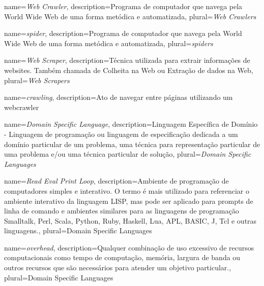 

				{name={\emph{Web Crawler}},
				 description={Programa de computador que navega pela World Wide Web de uma forma metódica e automatizada},
				 plural={\emph{Web Crawlers}}
				}

				{name={\emph{spider}},
				 description={Programa de computador que navega pela World Wide Web de uma forma metódica e automatizada},
				 plural={\emph{spiders}}
				}
				 
				{name={\emph{Web Scraper}},
				 description={Técnica utilizada para extrair informações de websites. Também chamada de Colheita na Web ou Extração de dados na Web},
				 plural={\emph{Web Scrapers}}
				 }
				 
				{name={\emph{crawling}},
				 description={Ato de navegar entre páginas utilizando um \gls{webcrawler}}
				}
				
				{name={\emph{Domain Specific Language}},
				 description={Linguagem Específica de Domínio - Linguagem de programação ou linguagem de especificação dedicada a um domínio particular de um problema, uma técnica para representação particular de uma problema e/ou uma técnica particular de solução},
				 plural={\emph{Domain Specific Languages}}
				}
				
				{name={\emph{Read Eval Print Loop}},
				 description={Ambiente de programação de computadores simples e interativo. O termo é mais utilizado para referenciar o ambiente interativo da linguagem LISP, mas pode ser aplicado para prompts de linha de comando e ambientes similares para as linguagens de programação Smalltalk, Perl, Scala, Python, Ruby, Haskell, Lua, APL, BASIC, J, Tcl e outras linguagens.},
				 plural={Domain Specific Languages}
				}

				{name={\emph{overhead}},
				 description={Qualquer combinação de uso excessivo de recursos computacionais como tempo de computação, memória, largura de banda ou outros recursos que são necessários para atender um objetivo particular.},
				 plural={Domain Specific Languages}
				}
